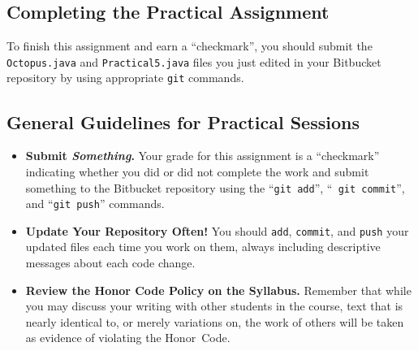 \vspace*{-.15in}
\subsection*{Completing the Practical Assignment}
\vspace*{-.1in}
To finish this assignment and earn a ``checkmark'', you should 
submit the {\tt Octopus.java} and {\tt Practical5.java} files you just edited
in your Bitbucket repository by
using appropriate {\tt git} commands.

\vspace*{-.15in}
\subsection*{General Guidelines for Practical Sessions}
\vspace*{-.05in}
\begin{itemize}
\item {\bf Submit \textbf{\textit{Something}}.} Your grade for this assignment is a ``checkmark'' indicating whether you
  did or did not complete the work and submit something to the Bitbucket repository using the ``{\tt git add}'', ``{\tt
    git commit}'', and ``{\tt git push}'' commands.

\item {\bf Update Your Repository Often!} You should {\tt add}, {\tt commit}, and {\tt push} your updated files each
  time you work on them, always including descriptive messages about each code change.

\item {\bf Review the Honor Code Policy on the Syllabus.} Remember that while you may discuss your writing with other
  students in the course, text that is nearly identical to, or merely variations on, the work of others will be
  taken as evidence of violating the \mbox{Honor Code}.
\end{itemize}



